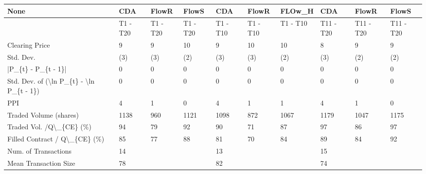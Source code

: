 \begin{tabular}{llllllllll}
\hline
 None                                                      & CDA      & FlowR    & FlowS    & CDA      & FlowR    & FLOw\_H   & CDA       & FlowR     & FlowS     \\
\hline
                                                           & T1 - T20 & T1 - T20 & T1 - T20 & T1 - T10 & T1 - T10 & T1 - T10 & T11 - T20 & T11 - T20 & T11 - T20 \\
 Clearing Price                                            & 9        & 9        & 10       & 9        & 10       & 10       & 8         & 9         & 9         \\
 Std. Dev.                                                 & (3)      & (3)      & (2)      & (3)      & (3)      & (2)      & (3)       & (2)       & (2)       \\
 |P\_\{t\} - P\_\{t - 1\}|                                       & 0        & 0        & 0        & 0        & 0        & 0        & 0         & 0         & 0         \\
 Std. Dev. of (\textbackslash{}ln P\_\{t\} - \textbackslash{}ln P\_\{t - 1\})                  & 0        & 0        & 0        & 0        & 0        & 0        & 0         & 0         & 0         \\
 PPI                                                       & 4        & 1        & 0        & 4        & 1        & 1        & 4         & 1         & 0         \\
 Traded Volume (shares)                                    & 1138     & 960      & 1121     & 1098     & 872      & 1067     & 1179      & 1047      & 1175      \\
 Traded Vol. /Q\textbackslash{}\_\{CE\} (\%)                                  & 94       & 79       & 92       & 90       & 71       & 87       & 97        & 86        & 97        \\
 Filled Contract / Q\textbackslash{}\_\{CE\} (\%)                             & 85       & 77       & 88       & 81       & 70       & 84       & 89        & 84        & 92        \\
 Num. of Transactions                                      & 14       &          &          & 13       &          &          & 15        &           &           \\
 Mean Transaction Size                                     & 78       &          &          & 82       &          &          & 74        &           &           \\

\end{tabular}
